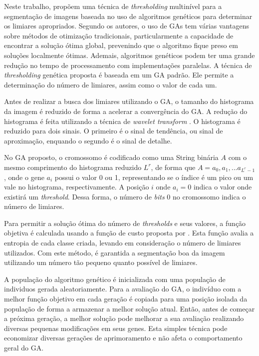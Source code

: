 \documentclass[12pt,oneside,a4paper,english,french,spanish,brazil,]{abntex2}
\begin{document}
Neste trabalho, \citet{hammouche:2008} propõem uma técnica de \textit{thresholding} multinível para a segmentação de imagens baseada no uso de algoritmos genéticos para determinar os limiares apropriados. Segundo os autores, o uso de GAs tem várias vantagens sobre métodos de otimização tradicionais, particularmente a capacidade de encontrar a solução ótima global, prevenindo que o algoritmo fique preso em soluções localmente ótimas. Ademais, algoritmos genéticos podem ter uma grande redução no tempo de processamento com implementações paralelas. A técnica de \textit{thresholding} genética proposta é baseada em um GA padrão. Ele permite a determinação do número de limiares, assim como o valor de cada um. 

Antes de realizar a busca dos limiares utilizando o GA, o tamanho do histograma da imagem é reduzido de forma a acelerar a convergência do GA. A redução do histograma é feita utilizando a técnica de \textit{wavelet transform} \cite{kim:2003}. O histograma é reduzido para dois sinais. O primeiro é o sinal de tendência, ou sinal de aproximação, enquando o segundo é o sinal de detalhe.

No GA proposto, o cromossomo é codificado como uma String binária \(A\) com o mesmo comprimento do histograma reduzido \(L^r\), de forma que \(A = a_0, a_1, ... a_{L^r-1}\), onde o gene \(a_i\) possui o valor 0 ou 1, representando se o índice é um pico ou um vale no histograma, respectivamente. A posição \(i\) onde \(a_i = 0\) indica o valor onde existirá um \textit{threshold}. Dessa forma, o número de \textit{bits} 0 no cromossomo indica o número de limiares.

Para permitir a solução ótima do número de \textit{thresholds} e seus valores, a função objetiva é calculada usando a função de custo proposta por \citet{yen:1995}. Esta função avalia a entropia de cada classe criada, levando em consideração o número de limiares utilizados. Com este método, é garantida a segmentação boa da imagem utilizando um número tão pequeno quanto possível de limiares.

A população do algoritmo genético é inicializada com uma população de individuos gerada aleatoriamente. Para a avaliação do GA, o indivíduo com a melhor função objetivo em cada geração é copiada para uma posição isolada da população de forma a armazenar a melhor solução atual. Então, antes de começar a próxima geração, a melhor solução pode melhorar a sua avaliação realizando diversas pequenas modificações em seus genes. Esta simples técnica pode economizar diversas gerações de aprimoramento e não afeta o comportamento geral do GA.
\end{document}
